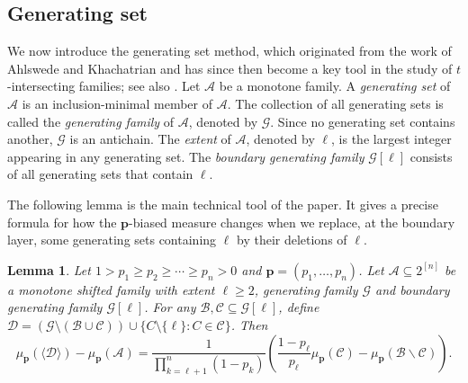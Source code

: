 \documentclass[11pt]{article}
\newtheorem{lemma}[theorem]{Lemma}
\begin{document}
\subsection{Generating set}

We now introduce the generating set method, which originated from the work of Ahlswede and Khachatrian \cite{A97} and has since then become a key tool in the study of $t$-intersecting families; see also \cite{F17, L25}.
Let $\mathcal{A}$ be a monotone family. A \textit{generating set} of $\mathcal{A}$ is an inclusion-minimal member of $\mathcal{A}$. The collection of all generating sets is called the \textit{generating family} of $\mathcal{A}$, denoted by $\mathcal{G}$. Since no generating set contains another, $\mathcal{G}$ is an antichain.
The \textit{extent} of $\mathcal{A}$, denoted by $\ell$, is the largest integer appearing in any generating set. The \textit{boundary generating family} $\mathcal{G}[\ell]$ consists of all generating sets that contain $\ell$.

The following lemma is the main technical tool of the paper. It gives a precise formula for how the $\mathbf{p}$-biased measure changes when we replace, at the boundary layer, some generating sets containing $\ell$ by their deletions of $\ell$.

\begin{lemma}\label{le2}
Let $1 > p_1 \ge p_2 \ge \cdots \ge p_n > 0$ and $\mathbf{p} = (p_1, \dots, p_n)$.
Let $\mathcal{A}\subseteq 2^{[n]}$ be a monotone shifted family with extent $\ell\geq 2$, generating family $\mathcal{G}$ and boundary generating family $\mathcal{G}[\ell]$.  For any $\mathcal{B},\mathcal{C}\subseteq \mathcal{G}[\ell]$, define $\mathcal{D}=(\mathcal{G}\setminus(\mathcal{B}\cup\mathcal{C}) 
)\cup\{C\setminus\{\ell\}: C\in\mathcal{C}\}$.  Then
$$
\mu_{\mathbf{p}}(\langle \mathcal{D} \rangle) - \mu_{\mathbf{p}}(\mathcal{A})
=
\frac{1}{\prod_{k=\ell+1}^n (1-p_k)} \left(
\frac{1-p_\ell}{p_\ell}  \mu_{\mathbf{p}}( \mathcal{C}) - \mu_{\mathbf{p}}( \mathcal{B}\backslash \mathcal{C} )
\right).
$$
\end{lemma}
\end{document}

